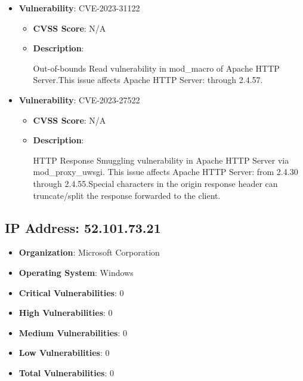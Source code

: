 \documentclass{article}
\begin{document}
\begin{itemize}
        \item \textbf{Vulnerability}: CVE-2023-31122
        \begin{itemize}
            \item \textbf{CVSS Score}:  N/A 
            \item \textbf{Description}:
            \parbox[t]{0.9\linewidth}{
                \ttfamily Out-of-bounds Read vulnerability in mod\_macro of Apache HTTP Server.This issue affects Apache HTTP Server: through 2.4.57.
            }
        \end{itemize}
    
        \item \textbf{Vulnerability}: CVE-2023-27522
        \begin{itemize}
            \item \textbf{CVSS Score}:  N/A 
            \item \textbf{Description}:
            \parbox[t]{0.9\linewidth}{
                \ttfamily HTTP Response Smuggling vulnerability in Apache HTTP Server via mod\_proxy\_uwsgi. This issue affects Apache HTTP Server: from 2.4.30 through 2.4.55.Special characters in the origin response header can truncate/split the response forwarded to the client.
            }
        \end{itemize}
    
\end{itemize}




\clearpage



\subsection{IP Address: 52.101.73.21}

\begin{itemize}
    \item \textbf{Organization}: Microsoft Corporation
    \item \textbf{Operating System}:  Windows 
    \item \textbf{Critical Vulnerabilities}: 0
    \item \textbf{High Vulnerabilities}: 0
    \item \textbf{Medium Vulnerabilities}: 0
    \item \textbf{Low Vulnerabilities}: 0
    \item \textbf{Total Vulnerabilities}: 0
\end{itemize}
\end{document}
